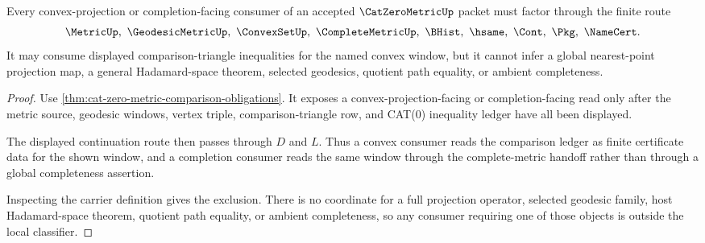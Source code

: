 \begin{theorem}
\label{thm:cat-zero-metric-projection-nonescape}
Every convex-projection or completion-facing consumer of an accepted $\CatZeroMetricUp$ packet must factor through the finite route
$$
\MetricUp,\ \GeodesicMetricUp,\ \ConvexSetUp,\ \CompleteMetricUp,\ \BHist,\ \hsame,\ \Cont,\ \Pkg,\ \NameCert .
$$
It may consume displayed comparison-triangle inequalities for the named convex window, but it cannot infer a global nearest-point projection map, a general Hadamard-space theorem, selected geodesics, quotient path equality, or ambient completeness.
\end{theorem}
\begin{proof}
Use \autoref{thm:cat-zero-metric-comparison-obligations}. It exposes a convex-projection-facing or completion-facing read only after the metric source, geodesic windows, vertex triple, comparison-triangle row, and CAT(0) inequality ledger have all been displayed.

The displayed continuation route then passes through $D$ and $L$. Thus a convex consumer reads the comparison ledger as finite certificate data for the shown window, and a completion consumer reads the same window through the complete-metric handoff rather than through a global completeness assertion.

Inspecting the carrier definition gives the exclusion. There is no coordinate for a full projection operator, selected geodesic family, host Hadamard-space theorem, quotient path equality, or ambient completeness, so any consumer requiring one of those objects is outside the local classifier.
\end{proof}


\begin{closurestatus}{\CatZeroMetricUp}
  \theoryclosure{\seedClosure}
  \formalstatus{\unformalizedV}
\end{closurestatus}
